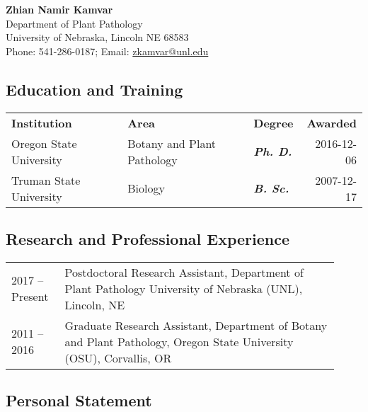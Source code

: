 \documentclass[12pt,letterpaper]{article}
\title{\ruleline{Biographical Sketch}}
\begin{document}
\maketitle

\begin{center}
{\bf Zhian Namir Kamvar}\\
Department of Plant Pathology \\
University of Nebraska, Lincoln NE 68583\\
Phone: 541-286-0187; Email: \href{mailto:zkamvar@unl.edu}{zkamvar@unl.edu}
\end{center}

\subsection*{Education and Training}  

\begin{center}
\begin{tabular}{lllr}%
\textbf{Institution} & \textbf{Area} & \textbf{Degree} & \textbf{Awarded}\\
Oregon State University & Botany and Plant Pathology & \textit{\textbf{Ph. D.}} & 2016-12-06\\
Truman State University & Biology  & \textit{\textbf{B. Sc.}} &  2007-12-17
\end{tabular}
\end{center}



\subsection*{Research and Professional Experience}

\begin{tabular}{p{0.15\linewidth}p{0.775\linewidth}}
2017 --	Present & Postdoctoral Research Assistant, Department of Plant Pathology 
			      University of Nebraska (UNL), Lincoln, NE\\
2011 -- 2016    & Graduate Research Assistant, Department of Botany and Plant 
                  Pathology, Oregon State University (OSU), Corvallis, OR
\end{tabular}

\subsection*{Personal Statement}
\end{document}
